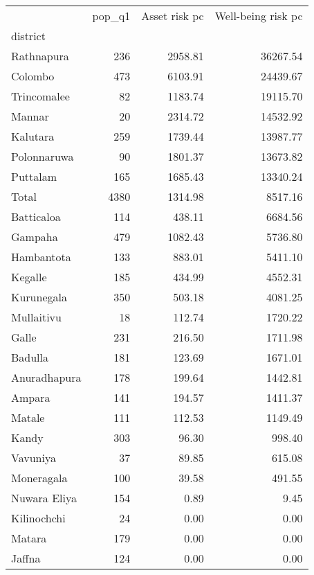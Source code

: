 \begin{tabular}{lrrr}
\toprule
{} &  pop\_q1 &  Asset risk pc &  Well-being risk pc \\
district     &         &                &                     \\
\midrule
Rathnapura   &     236 &        2958.81 &            36267.54 \\
Colombo      &     473 &        6103.91 &            24439.67 \\
Trincomalee  &      82 &        1183.74 &            19115.70 \\
Mannar       &      20 &        2314.72 &            14532.92 \\
Kalutara     &     259 &        1739.44 &            13987.77 \\
Polonnaruwa  &      90 &        1801.37 &            13673.82 \\
Puttalam     &     165 &        1685.43 &            13340.24 \\
Total        &    4380 &        1314.98 &             8517.16 \\
Batticaloa   &     114 &         438.11 &             6684.56 \\
Gampaha      &     479 &        1082.43 &             5736.80 \\
Hambantota   &     133 &         883.01 &             5411.10 \\
Kegalle      &     185 &         434.99 &             4552.31 \\
Kurunegala   &     350 &         503.18 &             4081.25 \\
Mullaitivu   &      18 &         112.74 &             1720.22 \\
Galle        &     231 &         216.50 &             1711.98 \\
Badulla      &     181 &         123.69 &             1671.01 \\
Anuradhapura &     178 &         199.64 &             1442.81 \\
Ampara       &     141 &         194.57 &             1411.37 \\
Matale       &     111 &         112.53 &             1149.49 \\
Kandy        &     303 &          96.30 &              998.40 \\
Vavuniya     &      37 &          89.85 &              615.08 \\
Moneragala   &     100 &          39.58 &              491.55 \\
Nuwara Eliya &     154 &           0.89 &                9.45 \\
Kilinochchi  &      24 &           0.00 &                0.00 \\
Matara       &     179 &           0.00 &                0.00 \\
Jaffna       &     124 &           0.00 &                0.00 \\
\bottomrule
\end{tabular}
